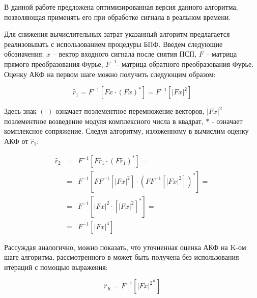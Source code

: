 В данной работе предложена оптимизированная версия данного алгоритма, позволяющая применять его при обработке сигнала в реальном времени.

Для снижения вычислительных затрат указанный алгоритм предлагается реализовывать с использованием процедуры БПФ. 
Введем следующие обозначения: ${x}$ – вектор входного сигнала после снятия ПСП, ${F}$ – матрица прямого преобразования Фурье, ${F^{-1}}$- матрица обратного преобразования Фурье.
Оценку АКФ на первом шаге можно получить следующим образом:

\begin{center}
\begin{equation}
	\label{eq:akf_1}
	\hat{r}_1 = F^{-1}\left[ Fx \cdot (Fx)^* \right] = F^{-1} \left[ \left| Fx \right| ^2 \right]
\end{equation}
\end{center}

Здесь знак ${(\cdot)}$  означает поэлементное перемножение векторов, ${\left| Fx \right| ^2}$ - поэлементное возведение модуля комплексного числа в квадрат, ${*}$ - означает
комплексное сопряжение.  Следуя алгоритму, изложенному в \cite{ostanin_akf} вычислим оценку АКФ от ${\hat{r}_1}$:

\begin{center}
\begin{eqnarray}
	\label{eq:akf_2}
	\hat{r}_2 & = & F^{-1}\left[ F \hat{r}_1 \cdot (F \hat{r}_1)^* \right] = \nonumber \\
		& = & F^{-1}	\left[ 
				FF^{-1} \left[
						\left| Fx \right| ^2
					\right]
						\cdot \left( FF^{-1} \left[ \left| Fx \right| ^2 \right]
					\right) ^*
			\right] = \nonumber \\
		& = & F^{-1} \left[ \left| Fx \right| ^2 \cdot \left[ \left| Fx \right| ^2 \right] ^* \right] =  \nonumber \\
		& = & F^{-1} \left[ \left| Fx \right| ^4 \right]
\end{eqnarray}
\end{center}

Рассуждая аналогично, можно показать, что уточненная оценка АКФ на K-ом шаге алгоритма, рассмотренного в \cite{ostanin_akf}
может быть получена без использования итераций с помощью выражения:

\begin{center}
\begin{equation}
	\label{eq:akf_3}
	\hat{r}_K = F^{-1}\left[ \left| Fx \right| ^{2^K} \right]
\end{equation}
\end{center}

